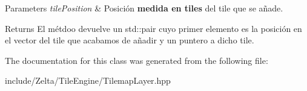 \begin{DoxyParams}{Parameters}
{\em tile\+Position} & Posición {\bfseries medida en tiles} del tile que se añade. \\
\hline
\end{DoxyParams}
\begin{DoxyReturn}{Returns}
El métdoo devuelve un std\+::pair cuyo primer elemento es la posición en el vector del tile que acabamos de añadir y un puntero a dicho tile. 
\end{DoxyReturn}


The documentation for this class was generated from the following file\+:\begin{DoxyCompactItemize}
\item 
include/\+Zelta/\+Tile\+Engine/Tilemap\+Layer.\+hpp\end{DoxyCompactItemize}
